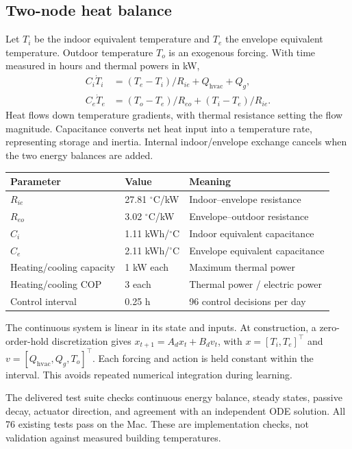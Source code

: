 \documentclass[10pt,a4paper]{article}
\begin{document}
\subsection*{Two-node heat balance}
Let $T_i$ be the indoor equivalent temperature and $T_e$ the envelope equivalent temperature. Outdoor temperature $T_o$ is an exogenous forcing. With time measured in hours and thermal powers in kW,
\begin{align}
C_i\dot T_i &= (T_e-T_i)/R_{ie}+Q_{\mathrm{hvac}}+Q_g,\\
C_e\dot T_e &= (T_o-T_e)/R_{eo}+(T_i-T_e)/R_{ie}.
\end{align}
Heat flows down temperature gradients, with thermal resistance setting the flow magnitude. Capacitance converts net heat input into a temperature rate, representing storage and inertia. Internal indoor/envelope exchange cancels when the two energy balances are added.

\begin{center}
\begin{tabular}{lll}
\toprule Parameter & Value & Meaning \\
\midrule
$R_{ie}$ & 27.81 $^\circ$C/kW & Indoor--envelope resistance \\
$R_{eo}$ & 3.02 $^\circ$C/kW & Envelope--outdoor resistance \\
$C_i$ & 1.11 kWh/$^\circ$C & Indoor equivalent capacitance \\
$C_e$ & 2.11 kWh/$^\circ$C & Envelope equivalent capacitance \\
Heating/cooling capacity & 1 kW each & Maximum thermal power \\
Heating/cooling COP & 3 each & Thermal power / electric power \\
Control interval & 0.25 h & 96 control decisions per day \\
\bottomrule
\end{tabular}
\end{center}

The continuous system is linear in its state and inputs. At construction, a zero-order-hold discretization gives $x_{t+1}=A_dx_t+B_dv_t$, with $x=[T_i,T_e]^\top$ and $v=[Q_{\mathrm{hvac}},Q_g,T_o]^\top$. Each forcing and action is held constant within the interval. This avoids repeated numerical integration during learning.

The delivered test suite checks continuous energy balance, steady states, passive decay, actuator direction, and agreement with an independent ODE solution. All 76 existing tests pass on the Mac. These are implementation checks, not validation against measured building temperatures.
\clearpage
\end{document}

